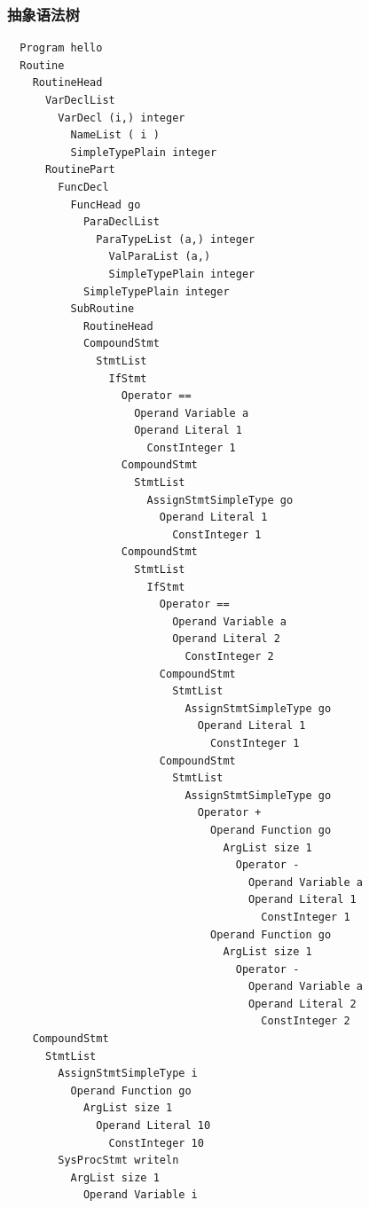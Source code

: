 \documentclass{article}
\begin{document}
\subsubsection{抽象语法树}
\begin{lstlisting}
  Program hello
  Routine
    RoutineHead
      VarDeclList
        VarDecl (i,) integer
          NameList ( i )
          SimpleTypePlain integer
      RoutinePart
        FuncDecl
          FuncHead go
            ParaDeclList
              ParaTypeList (a,) integer
                ValParaList (a,)
                SimpleTypePlain integer
            SimpleTypePlain integer
          SubRoutine
            RoutineHead
            CompoundStmt
              StmtList
                IfStmt
                  Operator ==
                    Operand Variable a
                    Operand Literal 1
                      ConstInteger 1
                  CompoundStmt
                    StmtList
                      AssignStmtSimpleType go
                        Operand Literal 1
                          ConstInteger 1
                  CompoundStmt
                    StmtList
                      IfStmt
                        Operator ==
                          Operand Variable a
                          Operand Literal 2
                            ConstInteger 2
                        CompoundStmt
                          StmtList
                            AssignStmtSimpleType go
                              Operand Literal 1
                                ConstInteger 1
                        CompoundStmt
                          StmtList
                            AssignStmtSimpleType go
                              Operator +
                                Operand Function go
                                  ArgList size 1
                                    Operator -
                                      Operand Variable a
                                      Operand Literal 1
                                        ConstInteger 1
                                Operand Function go
                                  ArgList size 1
                                    Operator -
                                      Operand Variable a
                                      Operand Literal 2
                                        ConstInteger 2
    CompoundStmt
      StmtList
        AssignStmtSimpleType i
          Operand Function go
            ArgList size 1
              Operand Literal 10
                ConstInteger 10
        SysProcStmt writeln
          ArgList size 1
            Operand Variable i
\end{lstlisting}
\end{document}
